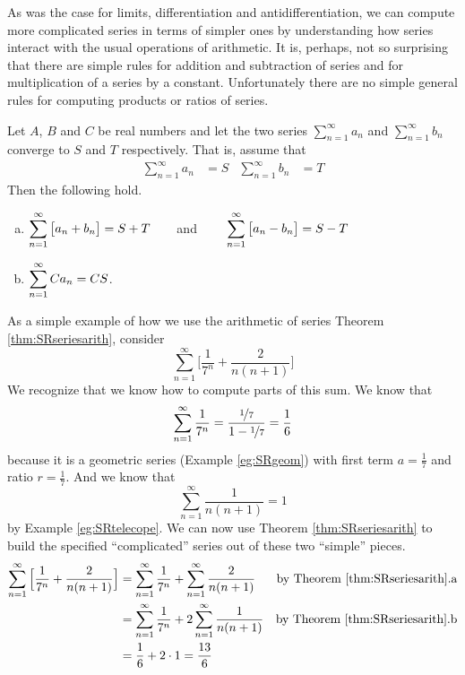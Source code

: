 As was the case for limits, differentiation and antidifferentiation,
we can compute more complicated series in
terms of simpler ones by understanding how series interact
with the usual operations of arithmetic. It is, perhaps,
not so surprising that there are simple rules for addition and subtraction
of series and for multiplication of a series by a constant. Unfortunately
there are no simple general rules for computing products or ratios of series.
\begin{theorem}\label{thm:SRseriesarith}
  Let $A$, $B$ and $C$ be real numbers and let the two series
$\sum_{n=1}^\infty a_n$ and  $\sum_{n=1}^\infty b_n$
converge to $S$ and $T$ respectively. That is, assume that
 \begin{align*}
  \sum_{n=1}^\infty a_n&=S & \sum_{n=1}^\infty b_n &=T
\end{align*}
  Then the following hold.
\begin{enumerate}[(a)]
 \item $\displaystyle \sum_{n=1}^\infty \big[a_n+b_n\big] = S+T\qquad$and
 $\qquad\displaystyle \sum_{n=1}^\infty \big[a_n-b_n\big] = S-T$
      \\
\item $\displaystyle \sum_{n=1}^\infty C a_n = C S$.
\end{enumerate}
\end{theorem}

\begin{eg}\label{eg:SRseriesarith}
As a simple example of how we use the arithmetic of series Theorem
\ref{thm:SRseriesarith}, consider
\begin{equation*}
\sum_{n=1}^\infty\Big[\frac{1}{7^n}+\frac{2}{n(n+1)}\Big]
\end{equation*}
We recognize that we know how to compute parts of this sum.
We know that
\begin{equation*}
\sum_{n=1}^\infty\frac{1}{7^n}=\frac{\nicefrac{1}{7}}{1-\nicefrac{1}{7}}
=\frac{1}{6}
\end{equation*}
because it is a geometric series (Example \ref{eg:SRgeom}) with
first term $a=\frac{1}{7}$ and ratio $r=\frac{1}{7}$. And we
know that
\begin{equation*}
\sum_{n=1}^\infty\frac{1}{n(n+1)} =1
\end{equation*}
by Example \ref{eg:SRtelecope}. We can now use Theorem
\ref{thm:SRseriesarith} to build the specified ``complicated''
series out of these two ``simple'' pieces.
\begin{align*}
\sum_{n=1}^\infty\Big[\frac{1}{7^n}+\frac{2}{n(n+1)}\Big]
&=\sum_{n=1}^\infty \frac{1}{7^n}
   +\sum_{n=1}^\infty\frac{2}{n(n+1)}
 & \text{by Theorem \ref{thm:SRseriesarith}.a} \\
&= \sum_{n=1}^\infty\frac{1}{7^n}
  +2 \sum_{n=1}^\infty \frac{1}{n(n+1)}
 & \text{by Theorem \ref{thm:SRseriesarith}.b} \\
&=\frac{1}{6}+2\cdot 1 =\frac{13}{6}
\end{align*}
\end{eg}


